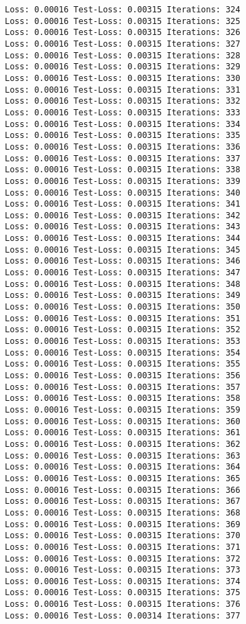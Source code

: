 \documentclass[11pt]{article}
\begin{document}
\begin{Verbatim}[commandchars=\\\{\}]
Loss: 0.00016 Test-Loss: 0.00315 Iterations: 324
Loss: 0.00016 Test-Loss: 0.00315 Iterations: 325
Loss: 0.00016 Test-Loss: 0.00315 Iterations: 326
Loss: 0.00016 Test-Loss: 0.00315 Iterations: 327
Loss: 0.00016 Test-Loss: 0.00315 Iterations: 328
Loss: 0.00016 Test-Loss: 0.00315 Iterations: 329
Loss: 0.00016 Test-Loss: 0.00315 Iterations: 330
Loss: 0.00016 Test-Loss: 0.00315 Iterations: 331
Loss: 0.00016 Test-Loss: 0.00315 Iterations: 332
Loss: 0.00016 Test-Loss: 0.00315 Iterations: 333
Loss: 0.00016 Test-Loss: 0.00315 Iterations: 334
Loss: 0.00016 Test-Loss: 0.00315 Iterations: 335
Loss: 0.00016 Test-Loss: 0.00315 Iterations: 336
Loss: 0.00016 Test-Loss: 0.00315 Iterations: 337
Loss: 0.00016 Test-Loss: 0.00315 Iterations: 338
Loss: 0.00016 Test-Loss: 0.00315 Iterations: 339
Loss: 0.00016 Test-Loss: 0.00315 Iterations: 340
Loss: 0.00016 Test-Loss: 0.00315 Iterations: 341
Loss: 0.00016 Test-Loss: 0.00315 Iterations: 342
Loss: 0.00016 Test-Loss: 0.00315 Iterations: 343
Loss: 0.00016 Test-Loss: 0.00315 Iterations: 344
Loss: 0.00016 Test-Loss: 0.00315 Iterations: 345
Loss: 0.00016 Test-Loss: 0.00315 Iterations: 346
Loss: 0.00016 Test-Loss: 0.00315 Iterations: 347
Loss: 0.00016 Test-Loss: 0.00315 Iterations: 348
Loss: 0.00016 Test-Loss: 0.00315 Iterations: 349
Loss: 0.00016 Test-Loss: 0.00315 Iterations: 350
Loss: 0.00016 Test-Loss: 0.00315 Iterations: 351
Loss: 0.00016 Test-Loss: 0.00315 Iterations: 352
Loss: 0.00016 Test-Loss: 0.00315 Iterations: 353
Loss: 0.00016 Test-Loss: 0.00315 Iterations: 354
Loss: 0.00016 Test-Loss: 0.00315 Iterations: 355
Loss: 0.00016 Test-Loss: 0.00315 Iterations: 356
Loss: 0.00016 Test-Loss: 0.00315 Iterations: 357
Loss: 0.00016 Test-Loss: 0.00315 Iterations: 358
Loss: 0.00016 Test-Loss: 0.00315 Iterations: 359
Loss: 0.00016 Test-Loss: 0.00315 Iterations: 360
Loss: 0.00016 Test-Loss: 0.00315 Iterations: 361
Loss: 0.00016 Test-Loss: 0.00315 Iterations: 362
Loss: 0.00016 Test-Loss: 0.00315 Iterations: 363
Loss: 0.00016 Test-Loss: 0.00315 Iterations: 364
Loss: 0.00016 Test-Loss: 0.00315 Iterations: 365
Loss: 0.00016 Test-Loss: 0.00315 Iterations: 366
Loss: 0.00016 Test-Loss: 0.00315 Iterations: 367
Loss: 0.00016 Test-Loss: 0.00315 Iterations: 368
Loss: 0.00016 Test-Loss: 0.00315 Iterations: 369
Loss: 0.00016 Test-Loss: 0.00315 Iterations: 370
Loss: 0.00016 Test-Loss: 0.00315 Iterations: 371
Loss: 0.00016 Test-Loss: 0.00315 Iterations: 372
Loss: 0.00016 Test-Loss: 0.00315 Iterations: 373
Loss: 0.00016 Test-Loss: 0.00315 Iterations: 374
Loss: 0.00016 Test-Loss: 0.00315 Iterations: 375
Loss: 0.00016 Test-Loss: 0.00315 Iterations: 376
Loss: 0.00016 Test-Loss: 0.00314 Iterations: 377

\end{Verbatim}
\end{document}
